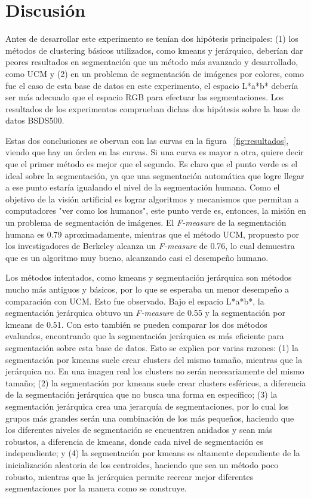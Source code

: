 \documentclass[10pt,twocolumn,letterpaper]{article}
\begin{document}
\section{Discusión}
Antes de desarrollar este experimento se tenían dos hipótesis principales: (1) los métodos de clustering básicos utilizados, como kmeans y jerárquico, deberían dar peores resultados en segmentación que un método más avanzado y desarrollado, como UCM y (2) en un problema de segmentación de imágenes por colores, como fue el caso de esta base de datos en este experimento, el espacio L*a*b* debería ser más adecuado que el espacio RGB para efectuar las segmentaciones. Los resultados de los experimentos comprueban dichas dos hipótesis sobre la base de datos BSDS500.

Estas dos conclusiones se obervan con las curvas en la figura ~\ref{fig:resultados}, viendo que hay un órden en las curvas. Si una curva es mayor a otra, quiere decir que el primer método es mejor que el segundo. Es claro que el punto verde es el ideal sobre la segmentación, ya que una segmentación automática que logre llegar a ese punto estaría igualando el nivel de la segmentación humana. Como el objetivo de la visión artificial es lograr algoritmos y mecanismos que permitan a computadores "ver como los humanos", este punto verde es, entonces, la misión en un problema de segmentación de imágenes. El \textit{F-measure} de la segmentación humana es 0.79 aproximadamente, mientras que el método UCM, propuesto por los investigadores de Berkeley alcanza un \textit{F-measure} de 0.76, lo cual demuestra que es un algoritmo muy bueno, alcanzando casi el desempeño humano. 

Los métodos intentados, como kmeans y segmentación jerárquica son métodos mucho más antiguos y básicos, por lo que se esperaba un menor desempeño a comparación con UCM. Esto fue observado. Bajo el espacio L*a*b*, la segmentación jerárquica obtuvo un \textit{F-measure} de 0.55 y la segmentación por kmeans de 0.51. Con esto también se pueden comparar los dos métodos evaluados, encontrando que la segmentación jerárquica es más eficiente para segmentación sobre esta base de datos. Esto se explica por varias razones: (1) la segmentación por kmeans suele crear clusters del mismo tamaño, mientras que la jerárquica no. En una imagen real los clusters no serán necesariamente del mismo tamaño; (2) la segmentación por kmeans suele crear clusters esféricos, a diferencia de la segmentación jerárquica que no busca una forma en específico; (3) la segmentación jerárquica crea una jerarquía de segmentaciones, por lo cual los grupos más grandes serán una combinación de los más pequeños, haciendo que los diferentes niveles de segmentación se encuentren anidados y sean más robustos, a diferencia de kmeans, donde cada nivel de segmentación es independiente; y (4) la segmentación por kmeans es altamente dependiente de la inicialización aleatoria de los centroides, haciendo que sea un método poco robusto, mientras que la jerárquica permite recrear mejor diferentes segmentaciones por la manera como se construye.
\end{document}
